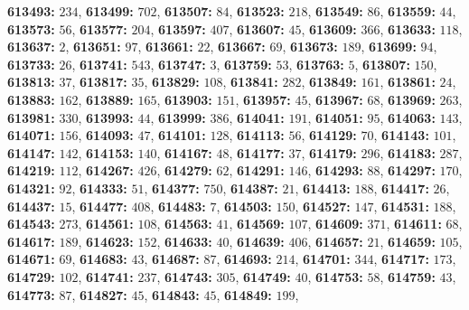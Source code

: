 \textsf{\bfseries 613493:} $234$, \textsf{\bfseries 613499:} $702$, \textsf{\bfseries 613507:} $84$, \textsf{\bfseries 613523:} $218$, \textsf{\bfseries 613549:} $86$, \textsf{\bfseries 613559:} $44$, \textsf{\bfseries 613573:} $56$, \textsf{\bfseries 613577:} $204$, \textsf{\bfseries 613597:} $407$, \textsf{\bfseries 613607:} $45$, \textsf{\bfseries 613609:} $366$, \textsf{\bfseries 613633:} $118$, \textsf{\bfseries 613637:} $2$, \textsf{\bfseries 613651:} $97$, \textsf{\bfseries 613661:} $22$, \textsf{\bfseries 613667:} $69$, \textsf{\bfseries 613673:} $189$, \textsf{\bfseries 613699:} $94$, \textsf{\bfseries 613733:} $26$, \textsf{\bfseries 613741:} $543$, \textsf{\bfseries 613747:} $3$, \textsf{\bfseries 613759:} $53$, \textsf{\bfseries 613763:} $5$, \textsf{\bfseries 613807:} $150$, \textsf{\bfseries 613813:} $37$, \textsf{\bfseries 613817:} $35$, \textsf{\bfseries 613829:} $108$, \textsf{\bfseries 613841:} $282$, \textsf{\bfseries 613849:} $161$, \textsf{\bfseries 613861:} $24$, \textsf{\bfseries 613883:} $162$, \textsf{\bfseries 613889:} $165$, \textsf{\bfseries 613903:} $151$, \textsf{\bfseries 613957:} $45$, \textsf{\bfseries 613967:} $68$, \textsf{\bfseries 613969:} $263$, \textsf{\bfseries 613981:} $330$, \textsf{\bfseries 613993:} $44$, \textsf{\bfseries 613999:} $386$, \textsf{\bfseries 614041:} $191$, \textsf{\bfseries 614051:} $95$, \textsf{\bfseries 614063:} $143$, \textsf{\bfseries 614071:} $156$, \textsf{\bfseries 614093:} $47$, \textsf{\bfseries 614101:} $128$, \textsf{\bfseries 614113:} $56$, \textsf{\bfseries 614129:} $70$, \textsf{\bfseries 614143:} $101$, \textsf{\bfseries 614147:} $142$, \textsf{\bfseries 614153:} $140$, \textsf{\bfseries 614167:} $48$, \textsf{\bfseries 614177:} $37$, \textsf{\bfseries 614179:} $296$, \textsf{\bfseries 614183:} $287$, \textsf{\bfseries 614219:} $112$, \textsf{\bfseries 614267:} $426$, \textsf{\bfseries 614279:} $62$, \textsf{\bfseries 614291:} $146$, \textsf{\bfseries 614293:} $88$, \textsf{\bfseries 614297:} $170$, \textsf{\bfseries 614321:} $92$, \textsf{\bfseries 614333:} $51$, \textsf{\bfseries 614377:} $750$, \textsf{\bfseries 614387:} $21$, \textsf{\bfseries 614413:} $188$, \textsf{\bfseries 614417:} $26$, \textsf{\bfseries 614437:} $15$, \textsf{\bfseries 614477:} $408$, \textsf{\bfseries 614483:} $7$, \textsf{\bfseries 614503:} $150$, \textsf{\bfseries 614527:} $147$, \textsf{\bfseries 614531:} $188$, \textsf{\bfseries 614543:} $273$, \textsf{\bfseries 614561:} $108$, \textsf{\bfseries 614563:} $41$, \textsf{\bfseries 614569:} $107$, \textsf{\bfseries 614609:} $371$, \textsf{\bfseries 614611:} $68$, \textsf{\bfseries 614617:} $189$, \textsf{\bfseries 614623:} $152$, \textsf{\bfseries 614633:} $40$, \textsf{\bfseries 614639:} $406$, \textsf{\bfseries 614657:} $21$, \textsf{\bfseries 614659:} $105$, \textsf{\bfseries 614671:} $69$, \textsf{\bfseries 614683:} $43$, \textsf{\bfseries 614687:} $87$, \textsf{\bfseries 614693:} $214$, \textsf{\bfseries 614701:} $344$, \textsf{\bfseries 614717:} $173$, \textsf{\bfseries 614729:} $102$, \textsf{\bfseries 614741:} $237$, \textsf{\bfseries 614743:} $305$, \textsf{\bfseries 614749:} $40$, \textsf{\bfseries 614753:} $58$, \textsf{\bfseries 614759:} $43$, \textsf{\bfseries 614773:} $87$, \textsf{\bfseries 614827:} $45$, \textsf{\bfseries 614843:} $45$, \textsf{\bfseries 614849:} $199$, 
